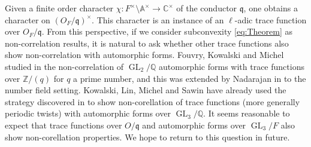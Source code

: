 \documentclass[a4paper,11pt]{amsart}
\theoremstyle{definition}
\newcommand{\A}{\mathbb{A}}
\newcommand{\Z}{\mathbb{Z}}
\newcommand{\Q}{\mathbb{Q}}
\newcommand{\gelle}{\operatorname{GL}}
\newcommand{\CC}{\mathbb{C}}
\begin{document}
   Given a finite order character $\chi \colon F^\times \setminus \A^\times \to \CC^\times$ of the conductor $\mathfrak{q}$, one obtains a character on $(O_F/\mathfrak{q})^\times$. This character is an instance of an $\ell$-adic trace function over $O_F/\mathfrak{q}$. From this perspective, if we consider subconvexity \eqref{eq:Theorem} as non-correlation results, it is natural to ask whether other trace functions also show non-correlation with automorphic forms. Fouvry, Kowalski and Michel studied in \cite{fouvry2015algebraic} the non-correlation of $\gelle_2/\Q$ automorphic forms with trace functions over $\Z/(q)$ for $q$ a prime number, and this was extended by Nadarajan in \cite{nadarajan2024algebraictwistsgl2automorphic} to the number field setting. Kowalski, Lin, Michel and Sawin \cite{kowalski2020periodic} have already used the strategy discovered in \cite{nelsonholowinsky} to show non-corellation of trace functions (more generally periodic twists) with automorphic forms over $\gelle_3/\Q$. It seems reasonable to expect that trace functions over $O/\mathfrak{q}$ and automorphic forms over $\gelle_3/F$ also show non-corellation properties. We hope to return to this question in future.
\end{document}
